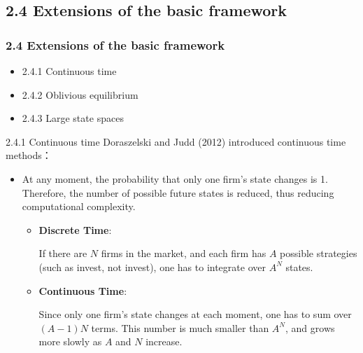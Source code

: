 \documentclass[aspectratio=169]{beamer}  %
\begin{document}
\subsection{2.4 Extensions of the basic framework}
\begin{frame}
\frametitle{2.4 Extensions of the basic framework}
    \begin{itemize}
        \item 2.4.1 Continuous time
        \item 2.4.2 Oblivious equilibrium
        \item 2.4.3 Large state spaces
    \end{itemize}

\end{frame}


\begin{frame}{2.4.1 Continuous time}
Doraszelski and Judd (2012) introduced continuous time methods：
\begin{itemize}
    \item At any moment, the probability that only one firm's state changes is 1. Therefore, the number of possible future states is reduced, thus reducing computational complexity.

\begin{itemize}
    \item \textbf{Discrete Time}:

    If there are \( N \) firms in the market, and each firm has \( A \) possible strategies (such as invest, not invest), one has to integrate over  $A^N$ states.
    \item \textbf{Continuous Time}:

    Since only one firm's state changes at each moment, one has to sum over $(A - 1)N$ terms. This number is much smaller than \( A^N \), and grows more slowly as \( A \) and \( N \) increase.
\end{itemize}
\end{itemize}

\end{frame}
\end{document}
